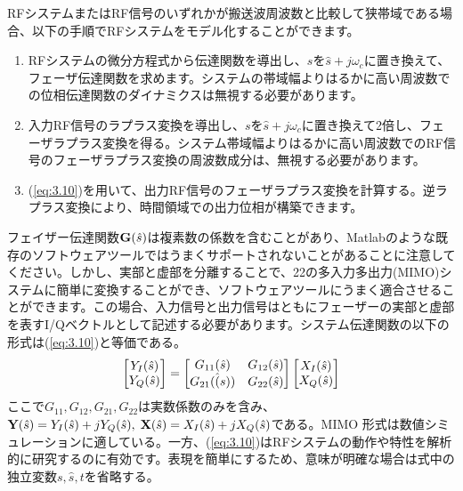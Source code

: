 \documentclass[book]{jlreq}
\begin{document}
RFシステムまたはRF信号のいずれかが搬送波周波数と比較して狭帯域である場合、以下の手順でRFシステムをモデル化することができます。
%
\begin{enumerate}
    \item RFシステムの微分方程式から伝達関数を導出し、$s$を$\hat{s}+j\omega_c$に置き換えて、フェーザ伝達関数を求めます。システムの帯域幅よりはるかに高い周波数での位相伝達関数のダイナミクスは無視する必要があります。
    \item 入力RF信号のラプラス変換を導出し、$s$を$\hat{s}+j\omega_c$に置き換えて2倍し、フェーザラプラス変換を得る。システム帯域幅よりはるかに高い周波数でのRF信号のフェーザラプラス変換の周波数成分は、無視する必要があります。
    \item (\ref{eq:3.10})を用いて、出力RF信号のフェーザラプラス変換を計算する。逆ラプラス変換により、時間領域での出力位相が構築できます。
\end{enumerate}
%
フェイザー伝達関数$\vb{G}(\hat{s})$は複素数の係数を含むことがあり、Matlabのような既存のソフトウェアツールではうまくサポートされないことがあることに注意してください。しかし、実部と虚部を分離することで、2\times2の多入力多出力(MIMO)システムに簡単に変換することができ、ソフトウェアツールにうまく適合させることができます。この場合、入力信号と出力信号はともにフェーザーの実部と虚部を表すI/Qベクトルとして記述する必要があります。システム伝達関数の以下の形式は(\ref{eq:3.10})と等価である。
%
\begin{equation}
    \begin{bmatrix}
        Y_I(\hat{s})\\
        Y_Q(\hat{s})
    \end{bmatrix}
    = \notag
    \begin{bmatrix}
        G_{11}(\hat{s}) & G_{12}(\hat{s}) \\
        G_{21}(\hat(s)) & G_{22}(\hat{s})
    \end{bmatrix}
    \begin{bmatrix}
        X_I(\hat{s}) \\
        X_Q(\hat{s})
    \end{bmatrix}
\end{equation}
%
ここで$G_{11}, G_{12}, G_{21}, G_{22}$は実数係数のみを含み、$\vb{Y}(\hat{s}) = Y_I(\hat{s}) + j Y_Q(\hat{s}), \; \vb{X}(\hat{s}) = X_I(\hat{s}) + j X_Q(\hat{s})$である。MIMO 形式は数値シミュレーションに適している。一方、(\ref{eq:3.10})はRFシステムの動作や特性を解析的に研究するのに有効です。表現を簡単にするため、意味が明確な場合は式中の独立変数$s, \hat{s}, t$を省略する。
\end{document}
